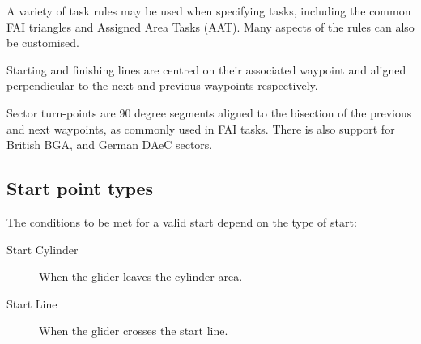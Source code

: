 A variety of task rules may be used when specifying tasks, including
the common FAI triangles and Assigned Area Tasks (AAT).  Many aspects
of the rules can also be customised.

Starting and finishing lines are centred on their associated waypoint
and aligned perpendicular to the next and previous waypoints
respectively.

Sector turn-points are 90 degree segments aligned to the bisection of
the previous and next waypoints, as commonly used in FAI tasks.
There is also support for British BGA, and German DAeC sectors.

\subsection*{Start point types}
The conditions to be met for a valid start depend on the type of start:
\begin{description}
\item[Start Cylinder] When the glider leaves the cylinder area.
\item[Start Line] When the glider crosses the start line.
\end{description}

